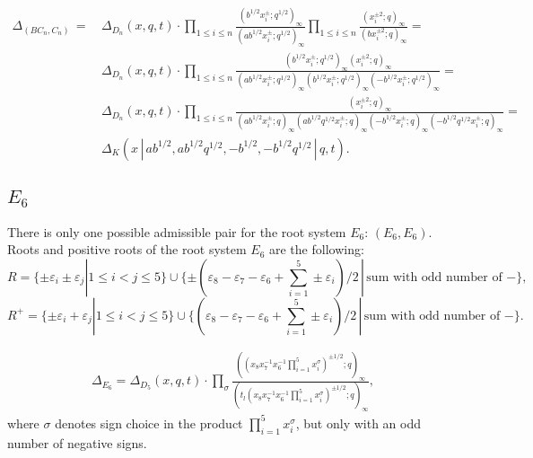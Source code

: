 \documentclass{article}
\def\nn{\nonumber}
\def\nn{\nonumber}
\def\ep{\varepsilon}
\begin{document}
\begin{align}
    \Delta_{(BC_n, C_n)}\, =\, & \Delta_{D_n}(x,q,t) \cdot \prod_{1\leq i\leq n}\frac{(b^{1/2}x_i^{\pm};q^{1/2})_{\infty
    }}{(a b^{1/2}x_i^{\pm};q^{1/2})_{\infty}}
    \prod_{1\leq i\leq n}\frac{(x_i^{\pm 2};q)_{\infty
    }}{(b x_i^{\pm 2};q)_{\infty}} \nn = \\
     & \Delta_{D_n}(x,q,t) \cdot \prod_{1\leq i\leq n} \frac{(b^{1/2}x_i^{\pm};q^{1/2})_{\infty
    } (x_i^{\pm 2};q)_{\infty
    }}{(a b^{1/2}x_i^{\pm};q^{1/2})_{\infty}(b^{1/2}x_i^{\pm};q^{1/2})_{\infty}(-b^{1/2}x_i^{\pm};q^{1/2})_{\infty}}
    \nn =
    \\ & \Delta_{D_n}(x,q,t) \cdot \prod_{1\leq i\leq n} \frac{(x_i^{\pm 2};q)_{\infty
    }}{(a b^{1/2}x_i^{\pm};q)_{\infty}(a b^{1/2} q^{1/2}x_i^{\pm};q)_{\infty}(-b^{1/2}x_i^{\pm};q)_{\infty}(- b^{1/2}q^{1/2}x_i^{\pm};q)_{\infty}} = \nn \\
    & \boxed{\Delta_K (x\,|\, a b^{1/2},  a b^{1/2} q^{1/2}, -b^{1/2}, - b^{1/2} q^{1/2} \,|\, q,t)}.
\end{align}

\subsection*{$E_6$}
There is only one possible admissible pair for the root system $E_6$: $(E_6,E_6)$. Roots and positive roots of the root system $E_6$ are the following:
\begin{equation}
    R= \{\pm \ep_i \pm \ep_j | 1\leq i<j\leq 5\}\cup \{ \pm(\ep_8 - \ep_7 -\ep_6 + \sum_{i=1}^5 \pm \ep_i)/2 \,|\, \text{sum with odd number of }-\},
\end{equation}
\begin{equation}
    R^{+}= \{\pm \ep_i + \ep_j | 1\leq i<j\leq 5\}\cup \{ (\ep_8 - \ep_7 -\ep_6 + \sum_{i=1}^5 \pm \ep_i)/2 \,|\, \text{sum with odd number of }-\}.
\end{equation}


\begin{align}
    \Delta_{E_6} = \Delta_{D_{5}}(x,q,t) \cdot \prod_{\sigma}\frac{((x_8 x_7^{-1}x_6^{-1}\prod^{5}_{i=1}x_i^{\sigma})^{\pm1/2};q)_{\infty}}{(t_l(x_8 x_7^{-1}x_6^{-1}\prod^{5}_{i=1}x_i^{\sigma})^{\pm1/2};q)_{\infty}},
\end{align}
where $\sigma$ denotes sign choice in the product $\prod^{5}_{i=1}x_i^{\sigma}$, but only with an odd number of negative signs.
\end{document}
